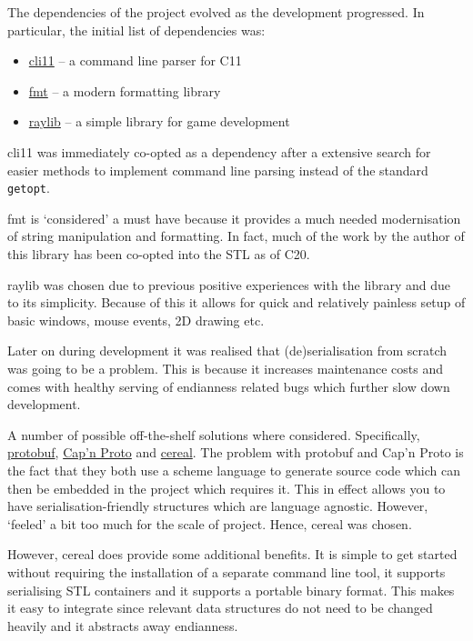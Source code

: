 \documentclass[article]{uom-coursework}
\def\CC{{C\nolinebreak\raisebox{.25ex}{\scriptsize\bfseries{++}}}}
\begin{document}
The dependencies of the project evolved as the
development progressed. In particular, the
initial list of dependencies was:

\begin{itemize}
    \item \href{https://github.com/CLIUtils/CLI11}{cli11} -- a command line parser for \CC{}11
    \item \href{https://github.com/fmtlib/fmt}{fmt} -- a modern formatting library
    \item \href{https://github.com/raysan5/raylib}{raylib} -- a simple library for game development
\end{itemize}

cli11 was immediately co-opted as a dependency after a extensive
search for easier methods to implement command line parsing
instead of the standard \texttt{getopt}.

fmt is `considered' a must have because it provides a much
needed modernisation of string manipulation and formatting. In
fact, much of the work by the author of this library has been
co-opted into the STL as of \CC{}20.

raylib was chosen due to previous positive experiences with the
library and due to its simplicity. Because of this it allows for
quick and relatively painless setup of basic windows, mouse
events, 2D drawing etc.

Later on during development it was realised that
(de)serialisation from scratch was going to be a problem. This
is because it increases maintenance costs and comes with healthy
serving of endianness related bugs which further slow down
development.

A number of possible off-the-shelf solutions where considered.
Specifically, \href{https://protobuf.dev/}{protobuf},
\href{https://capnproto.org/}{Cap'n Proto} and
\href{https://uscilab.github.io/cereal/}{cereal}. The problem
with protobuf and Cap'n Proto is the fact that they both use a
scheme language to generate source code which can then be
embedded in the project which requires it. This in effect allows
you to have serialisation-friendly structures which are language
agnostic. However, `feeled' a bit too much for the scale of
project. Hence, cereal was chosen.

However, cereal does provide some additional benefits. It is
simple to get started without requiring the installation of a
separate command line tool, it supports serialising STL
containers and it supports a portable binary format. This makes
it easy to integrate since relevant data structures do not need
to be changed heavily and it abstracts away endianness.
\end{document}
